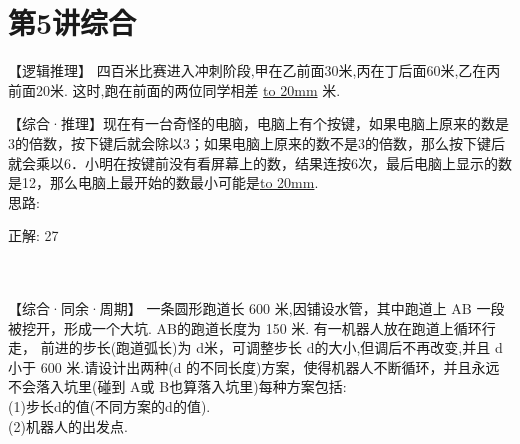 \section{第5讲\quad 综合}


\item {
    【逻辑推理】
    四百米比赛进入冲刺阶段,甲在乙前面30米,丙在丁后面60米,乙在丙前面20米. 这时,跑在前面的两位同学相差 \underline{\hbox to 20mm{}} 米.
    \vspace{2cm}
}

\item {
    【综合·推理】现在有一台奇怪的电脑，电脑上有个按键，如果电脑上原来的数是3的倍数，按下键后就会除以3；如果电脑上原来的数不是3的倍数，那么按下键后就会乘以6．小明在按键前没有看屏幕上的数，结果连按6次，最后电脑上显示的数是12，那么电脑上最开始的数最小可能是\underline{\hbox to 20mm{}}.
    \ifshowSolution
        \fangsong{}
        \\
        思路:

        正解: 27
    \else
        \\ \\ \\
    \fi
}

\item {
    【综合·同余·周期】
    一条圆形跑道长 600 米,因铺设水管，其中跑道上 AB 一段被挖开，形成一个大坑. AB的跑道长度为 150 米.  有一机器人放在跑道上循环行走， 前进的步长(跑道弧长)为 d米，可调整步长 d的大小,但调后不再改变,并且 d小于 600 米.请设计出两种(d 的不同长度)方案，使得机器人不断循环，并且永远不会落入坑里(碰到 A或 B也算落入坑里)每种方案包括:\\
    (1)步长d的值(不同方案的d的值). \\
    (2)机器人的出发点.
    \vspace{2cm}
}
